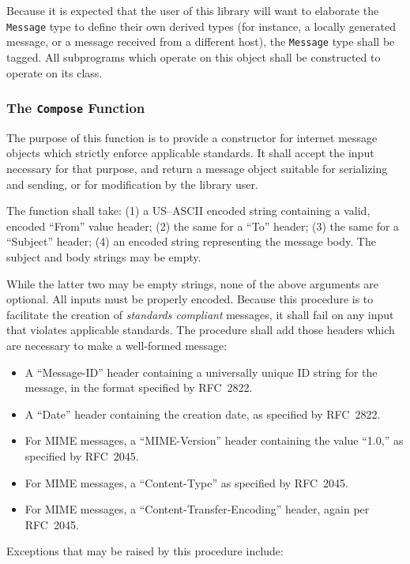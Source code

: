 \documentclass[11pt]{article}
\begin{document}
Because it is expected that the user of this library will want to
elaborate the \texttt{Message} type to define their own derived types
(for instance, a locally generated message, or a message received from
a different host), the \texttt{Message} type shall be tagged. All
subprograms which operate on this object shall be constructed to
operate on its class.

\subsubsection{The \texttt{Compose} Function}

The purpose of this function is to provide a constructor for internet
message objects which strictly enforce applicable standards. It shall
accept the input necessary for that purpose, and return a message
object suitable for serializing and sending, or for modification by the
library user.

The function shall take: (1) a US--ASCII encoded string containing a
valid, encoded ``From'' value header; (2) the same for a ``To''
header; (3) the same for a ``Subject'' header; (4) an encoded string
representing the message body. The subject and body strings may be
empty.

While the latter two may be empty strings, none of the above arguments
are optional. All inputs must be properly encoded. Because this
procedure is to facilitate the creation of \emph{standards compliant}
messages, it shall fail on any input that violates applicable
standards. The procedure shall add those headers which are necessary
to make a well-formed message:

\begin{itemize}
\item A ``Message-ID'' header containing a universally unique ID
  string for the message, in the format specified by RFC~2822.
\item A ``Date'' header containing the creation date, as specified by
  RFC~2822.
\item For MIME messages, a ``MIME-Version'' header containing the
  value ``1.0,'' as specified by RFC~2045.
\item For MIME messages, a ``Content-Type'' as specified by RFC~2045.
\item For MIME messages, a ``Content-Transfer-Encoding'' header, again
  per RFC~2045.
\end{itemize}

Exceptions that may be raised by this procedure include:
\end{document}
